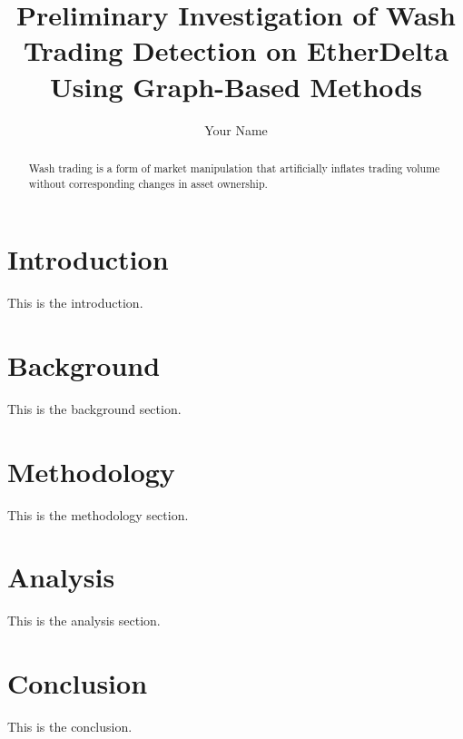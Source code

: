 \documentclass{article}
\title{Preliminary Investigation of Wash Trading Detection on EtherDelta Using Graph-Based Methods}
\author{Your Name}
\begin{document}
\maketitle

\begin{abstract}
Wash trading is a form of market manipulation that artificially inflates trading volume without corresponding changes in asset ownership.
\end{abstract}

\tableofcontents

\chapter{Introduction}
This is the introduction.

\chapter{Background}
This is the background section.

\chapter{Methodology}
This is the methodology section.

\chapter{Analysis}
This is the analysis section.

\chapter{Conclusion}
This is the conclusion.
\end{document}
